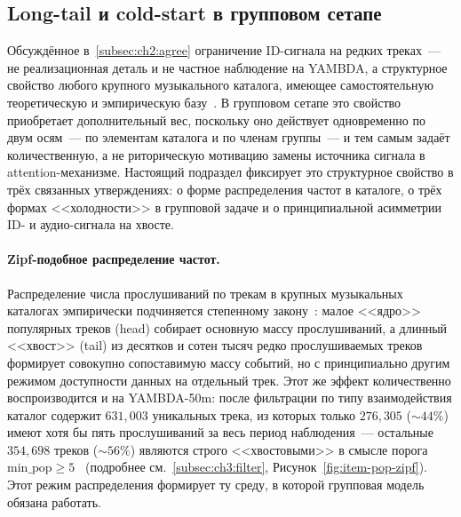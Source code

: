 \subsection{Long-tail и cold-start в групповом сетапе}
\label{subsec:ch2:longtail}

Обсуждённое в~\ref{subsec:ch2:agree} ограничение ID-сигнала на редких треках~--- не реализационная деталь и не частное наблюдение на YAMBDA, а структурное свойство любого крупного музыкального каталога, имеющее самостоятельную теоретическую и эмпирическую базу~\cite{park2008longtail, schedl2018current}. В групповом сетапе это свойство приобретает дополнительный вес, поскольку оно действует одновременно по двум осям~--- по элементам каталога и по членам группы~--- и тем самым задаёт количественную, а не риторическую мотивацию замены источника сигнала в attention-механизме. Настоящий подраздел фиксирует это структурное свойство в трёх связанных утверждениях: о форме распределения частот в каталоге, о трёх формах <<холодности>> в групповой задаче и о принципиальной асимметрии ID- и аудио-сигнала на хвосте.

\paragraph{Zipf-подобное распределение частот.} Распределение числа прослушиваний по трекам в крупных музыкальных каталогах эмпирически подчиняется степенному закону~\cite{park2008longtail}: малое <<ядро>> популярных треков (head) собирает основную массу прослушиваний, а длинный <<хвост>> (tail) из десятков и сотен тысяч редко прослушиваемых треков формирует совокупно сопоставимую массу событий, но с принципиально другим режимом доступности данных на отдельный трек. Этот же эффект количественно воспроизводится и на YAMBDA-50m: после фильтрации по типу взаимодействия каталог содержит $631{,}003$ уникальных трека, из которых только $276{,}305$ ($\sim\!44\%$) имеют хотя бы пять прослушиваний за весь период наблюдения~--- остальные $354{,}698$ треков ($\sim\!56\%$) являются строго <<хвостовыми>> в смысле порога $\mathrm{min\_pop} \geq 5$~\cite{yambda2025} (подробнее см.~\ref{subsec:ch3:filter}, Рисунок~\ref{fig:item-pop-zipf}). Этот режим распределения формирует ту среду, в которой групповая модель обязана работать.

